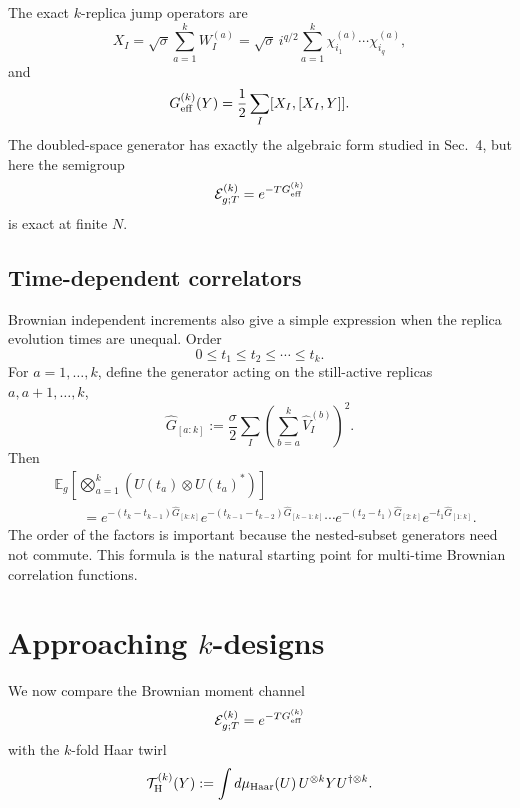 \documentclass{article}
\theoremstyle{definition}
\begin{document}
The exact $k$-replica jump operators are
\begin{equation}
    X_I
    =\sqrt\sigma\sum_{a=1}^kW_I^{(a)}
    =\sqrt\sigma\,i^{q/2}
      \sum_{a=1}^k
      \chi_{i_1}^{(a)}\cdots\chi_{i_q}^{(a)},
\end{equation}
and
\begin{equation}
    G_{\rm eff}^{(k)}(Y)
    =\frac12\sum_I[X_I,[X_I,Y]].
\end{equation}
The doubled-space generator has exactly the algebraic form studied in
Sec.~4, but here the semigroup
\begin{equation}
    {\cal E}_{g;T}^{(k)}=e^{-TG_{\rm eff}^{(k)}}
\end{equation}
is exact at finite $N$.

\subsection{Time-dependent correlators}

Brownian independent increments also give a simple expression when the
replica evolution times are unequal.  Order
\begin{equation}
    0\le t_1\le t_2\le\cdots\le t_k.
\end{equation}
For $a=1,\ldots,k$, define the generator acting on the still-active
replicas $a,a+1,\ldots,k$,
\begin{equation}
    \widehat G_{[a:k]}
    :=\frac{\sigma}{2}\sum_I
      \left(
         \sum_{b=a}^k\widehat V_I^{(b)}
      \right)^2.
\end{equation}
Then
\begin{align}
    &\mathbb E_g\!\left[
       \bigotimes_{a=1}^k
       \left(U(t_a)\otimes U(t_a)^*\right)
    \right]
    \nonumber\\
    &\qquad=
    e^{-(t_k-t_{k-1})\widehat G_{[k:k]}}
    e^{-(t_{k-1}-t_{k-2})\widehat G_{[k-1:k]}}
    \cdots
    e^{-(t_2-t_1)\widehat G_{[2:k]}}
    e^{-t_1\widehat G_{[1:k]}}.
\end{align}
The order of the factors is important because the nested-subset generators
need not commute.  This formula is the natural starting point for
multi-time Brownian correlation functions.


\section{Approaching $k$-designs}

We now compare the Brownian moment channel
\begin{equation}
    {\cal E}_{g;T}^{(k)}=e^{-TG_{\rm eff}^{(k)}}
\end{equation}
with the $k$-fold Haar twirl
\begin{equation}
    {\cal T}_{\rm H}^{(k)}(Y)
    :=\int d\mu_{\rm Haar}(U)\,
      U^{\otimes k}YU^{\dagger\otimes k}.
\end{equation}
\end{document}
